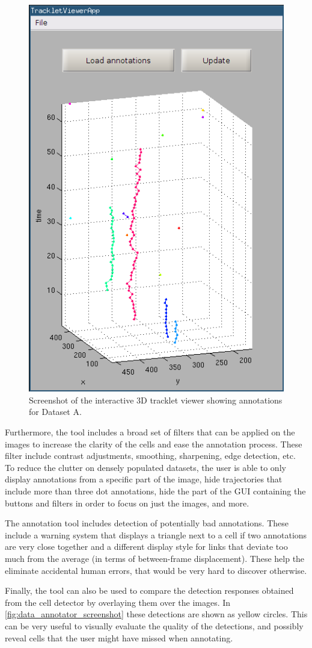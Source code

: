 		\begin{figure}
			\centering
			\includegraphics[width=.48\textwidth]{images/data_tracklet_viewer}
			\caption{Screenshot of the interactive 3D tracklet viewer showing annotations for Dataset A.}
			\label{fig:data_tracklet_viewer}
			
		\end{figure}
				
						
		Furthermore, the tool includes a broad set of filters that can be applied on the images to increase the clarity of the cells and ease the annotation process. These filter include contrast adjustments, smoothing, sharpening, edge detection, etc. To reduce the clutter on densely populated datasets, the user is able to only display annotations from a specific part of the image, hide trajectories that include more than three dot annotations, hide the part of the GUI containing the buttons and filters in order to focus on just the images, and more.
		
		The annotation tool includes detection of potentially bad annotations. These include a warning system that displays a triangle next to a cell if two annotations are very close together and a different display style for links that deviate too much from the average (in terms of between-frame displacement). These help the eliminate accidental human errors, that would be very hard to discover otherwise.


		Finally, the tool can also be used to compare the detection responses obtained from the cell detector by overlaying them over the images. In \cref{fig:data_annotator_screenshot} these detections are shown as yellow circles. This can be very useful to visually evaluate the quality of the detections, and possibly reveal cells that the user might have missed when annotating.
		

